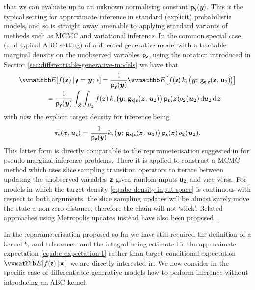 that we can evaluate up to an unknown normalising constant $\mathsf{p}_{\boldsymbol{\mathsf{y}}}(\boldsymbol{y})$. This is the typical setting for approximate inference in standard (explicit) probabilistic models, and so is straight away amenable to applying standard variants of methods such as \ac{MCMC} and variational inference. In the common special case (and typical \ac{ABC} setting) of a directed generative model with a tractable marginal density on the unobserved variables $\mathsf{p}_{\boldsymbol{\mathsf{z}}}$, using the notation introduced in Section \eqref{sec:differentiable-generative-models} we have that
\begin{align}\label{eq:abc-expectation-input-space-directed}
  &\expc{f(\rvct{z}) \gvn \rvct{y}=\vct{y};\,\epsilon} =
  \frac{1}{\pden{\rvct{y}}(\vct{y})} 
  \expc{f(\rvct{z}) \, k_\epsilon\lpa\vct{y};\,\genfunc_{\rvct{x}|\rvct{z}}(\rvct{z},\,\rvct{u}_2)\rpa}
  \\
  &\qquad\qquad=
  \frac{1}{\pden{\rvct{y}}(\vct{y})}
  \int_\set{Z}\int_{\set{U}_2} 
    f(\vct{z}) \,
    k_\epsilon{\lpa\vct{y};\,\genfunc_{\rvct{x}|\rvct{z}}(\vct{z},\,\vct{u}_2)\rpa}\,
    \pden{\rvct{z}}(\vct{z})
    \rho_2(\vct{u}_2)
  \,\dr\vct{u}_2\,\dr\vct{z}
\end{align}
with now the explicit target density for inference being
\begin{equation}\label{eq:abc-density-input-space-directed}
  \pi_\epsilon(\vct{z},\vct{u}_2) = \frac{1}{\pden{\rvct{y}}(\vct{y})} 
  k_\epsilon{\lpa\vct{y};\,\genfunc_{\rvct{x}|\rvct{z}}(\vct{z},\,\vct{u}_2)\rpa}\,\pden{\rvct{z}}(\vct{z})\,\rho_2(\vct{u}_2).
\end{equation}
This latter form is directly comparable to the reparameterisation suggested in \citep{murray2010slice}  for pseudo-marginal inference problems. There it is applied to construct a \ac{MCMC} method which uses slice sampling transition operators to iterate between updating the unobserved variables $\boldsymbol{\mathsf{z}}$ given random inputs $\boldsymbol{\mathsf{u}}_2$ and vice versa. For models in which the target density \eqref{eq:abc-density-input-space} is continuous with respect to both arguments, the slice sampling updates will be almost surely move the state a non-zero distance, therefore the chain will not `stick'. Related approaches using Metropolis updates instead have also been proposed \citep{dahlin2015accelerating,deligiannidis2015correlated}.

In the reparameterisation proposed so far we have still required the definition of a kernel $k_\epsilon$ and tolerance $\epsilon$ and the integral being estimated is the approximate expectation \eqref{eq:abc-expectation-1} rather than target conditional expectation $\expc{f(\rvct{z}) \gvn \rvct{x}\,}$ we are directly interested in. We now consider in the specific case of differentiable generative models how to perform inference without introducing an \ac{ABC} kernel.


